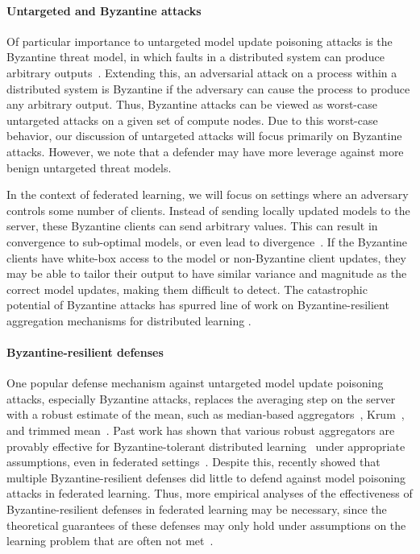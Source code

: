 \paragraph{Untargeted and Byzantine attacks} Of particular importance to untargeted model update poisoning attacks is the Byzantine threat model, in which faults in a distributed system can produce arbitrary outputs~\citep{lamport1982byzantine}. Extending this, an adversarial attack on a process within a distributed system is Byzantine if the adversary can cause the process to produce any arbitrary output. Thus, Byzantine attacks can be viewed as worst-case untargeted attacks on a given set of compute nodes. Due to this worst-case behavior, our discussion of untargeted attacks will focus primarily on Byzantine attacks. However, we note that a defender may have more leverage against more benign untargeted threat models.

In the context of federated learning, we will focus on settings where an adversary controls some number of clients. Instead of sending locally updated models to the server, these Byzantine clients can send arbitrary values. This can result in convergence to sub-optimal models, or even lead to divergence~\citep{blanchard2017machine}. If the Byzantine clients have white-box access to the model or non-Byzantine client updates, they may be able to tailor their output to have similar variance and magnitude as the correct model updates, making them difficult to detect. The catastrophic potential of Byzantine attacks has spurred line of work on Byzantine-resilient aggregation mechanisms for distributed learning \citep{peva17, chen18draco, mhamdi2018hidden, alistarh2018byzantine, yin2018byzantine, pmlr-v97-diakonikolas19a}.

\paragraph{Byzantine-resilient defenses} One popular defense mechanism against untargeted model update poisoning attacks, especially Byzantine attacks, replaces the averaging step on the server with a robust estimate of the mean, such as median-based aggregators~\citep{Chen2017DistributedSM, yin2018byzantine},  Krum~\citep{blanchard2017machine}, and trimmed mean~\citep{yin2018byzantine}. Past work has shown that various robust aggregators are provably effective for Byzantine-tolerant distributed learning~\citep{Su2016FaultTolerantMO, blanchard2017machine, Chen2017DistributedSM} under appropriate assumptions, even in federated settings~\citep{pillutla2019robust, xie2019practicalsecure, BREA2020}. Despite this, \citet{fang2019local} recently showed that multiple Byzantine-resilient defenses did little to defend against model poisoning attacks in federated learning. Thus, more empirical analyses of the effectiveness of Byzantine-resilient defenses in federated learning may be necessary, since the theoretical guarantees of these defenses may only hold under assumptions on the learning problem that are often not met~\citep{baruch2019little, rajput2019detox}.

